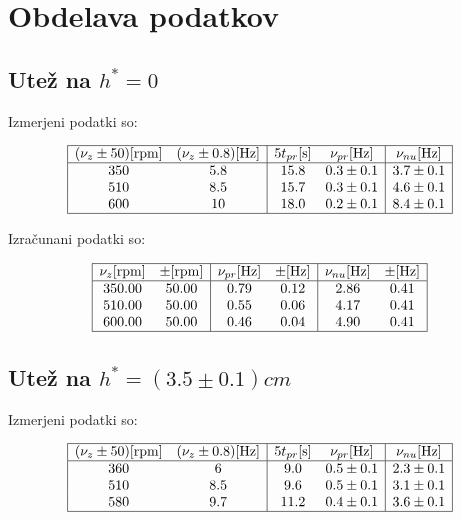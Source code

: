 \documentclass[12pt]{report}
\begin{document}
\endgroup


\chapter*{Obdelava podatkov}

\section*{Utež na $h^*=0$}

Izmerjeni podatki so: 

\begin{tabela}[H]
  \centering
  \[
  \begin{array}{|cc|cc|c|}\hline
    (\nu_z \pm 50) [\si{rpm}] & (\nu_z \pm 0.8) [\si{Hz}] & 5t_{pr} [\si{s}] & \nu_{pr} [\si{Hz}] & \nu_{nu} [\si{Hz}] \\ \hline 
    350 & 5.8 & 15.8 & 0.3 \pm 0.1 & 3.7 \pm 0.1 \\
    510 & 8.5 & 15.7 & 0.3 \pm 0.1 & 4.6 \pm 0.1 \\
    600 & 10 & 18.0 & 0.2 \pm 0.1 & 8.4 \pm 0.1 \\ \hline 
  \end{array}
  \]
\end{tabela}

Izračunani podatki so: 

\begin{tabela}[H]
  \centering
  \[
  \begin{array}{|c c|c c|c c|}\hline 
    \nu_z [\si{rpm}] & \pm [\si{rpm}] & \nu_{pr} [\si{Hz}] & \pm [\si{Hz}] & \nu_{nu} [\si{Hz}] & \pm [\si{Hz}] \\\hline
    350.00 &   50.00 &    0.79 &    0.12 &    2.86 &    0.41\\
    510.00 &   50.00 &    0.55 &    0.06 &    4.17 &    0.41\\
    600.00 &   50.00 &    0.46 &    0.04 &    4.90 &    0.41 \\ \hline 
  \end{array}
  \]
\end{tabela}

\section*{Utež na $h^*=(3.5 \pm 0.1) \si{cm}$}

Izmerjeni podatki so: 

\begin{tabela}[H]
  \centering
  \[
  \begin{array}{|c c|c c| c|}\hline
    (\nu_z \pm 50) [\si{rpm}] & (\nu_z \pm 0.8) [\si{Hz}] & 5t_{pr} [\si{s}] & \nu_{pr} [\si{Hz}] & \nu_{nu} [\si{Hz}] \\ \hline 
    360 & 6 & 9.0 & 0.5 \pm 0.1 & 2.3 \pm 0.1 \\
    510 & 8.5 & 9.6 & 0.5 \pm 0.1 & 3.1 \pm 0.1 \\
    580 & 9.7 & 11.2 & 0.4 \pm 0.1 & 3.6 \pm 0.1 \\ \hline 
  \end{array}
  \]
\end{tabela}
\end{document}

